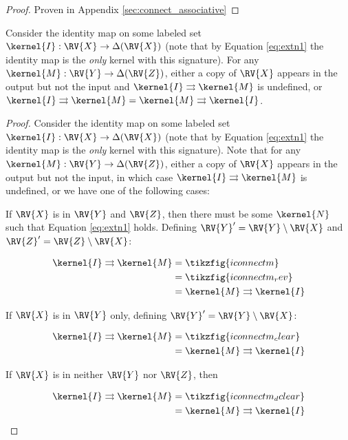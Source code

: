 \begin{proof}
Proven in Appendix \ref{sec:connect_associative}
\end{proof}

\begin{lemma}
Consider the identity map on some labeled set $\kernel{I}:\RV{X}\to \Delta(\RV{X})$ (note that by Equation \ref{eq:extn1} the identity map is the \emph{only} kernel with this signature). For any $\kernel{M}:\RV{Y}\to\Delta(\RV{Z})$, either a copy of $\RV{X}$ appears in the output but not the input and $\kernel{I}\rightrightarrows \kernel{M}$ is undefined, or $\kernel{I}\rightrightarrows\kernel{M}=\kernel{M}\rightrightarrows\kernel{I}$.
\end{lemma}

\begin{proof}
Consider the identity map on some labeled set $\kernel{I}:\RV{X}\to \Delta(\RV{X})$ (note that by Equation \ref{eq:extn1} the identity map is the \emph{only} kernel with this signature). Note that for any $\kernel{M}:\RV{Y}\to\Delta(\RV{Z})$, either a copy of $\RV{X}$ appears in the output but not the input, in which case $\kernel{I}\rightrightarrows \kernel{M}$ is undefined, or we have one of the following cases:

If $\RV{X}$ is in $\RV{Y}$ and $\RV{Z}$, then there must be some $\kernel{N}$ such that Equation \ref{eq:extn1} holds. Defining $\RV{Y}'=\RV{Y}\setminus\RV{X}$ and $\RV{Z}'=\RV{Z}\setminus\RV{X}$:

\begin{align}
    \kernel{I}\rightrightarrows\kernel{M}&=\tikzfig{iconnectm}\\
                                         &=\tikzfig{iconnectm_rev}\\
                                         &=\kernel{M}\rightrightarrows\kernel{I}
\end{align}


If $\RV{X}$ is in $\RV{Y}$ only, defining $\RV{Y}'=\RV{Y}\setminus\RV{X}$:

\begin{align}
    \kernel{I}\rightrightarrows\kernel{M}&=\tikzfig{iconnectm_clear}\\
                                         &=\kernel{M}\rightrightarrows\kernel{I}
\end{align}

If $\RV{X}$ is in neither $\RV{Y}$ nor $\RV{Z}$, then

\begin{align}
    \kernel{I}\rightrightarrows\kernel{M}&=\tikzfig{iconnectm_dclear}\\
                                         &=\kernel{M}\rightrightarrows\kernel{I}
\end{align}
\end{proof}

